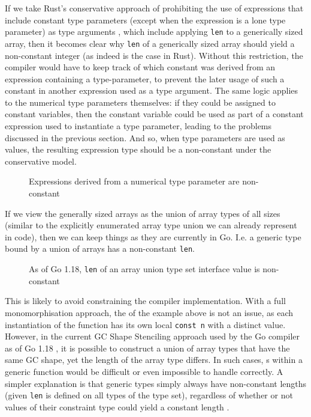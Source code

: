 If we take Rust's conservative approach of prohibiting the use of expressions
that include constant type parameters (except when the expression is a lone type
parameter) as type arguments \autocite{rustConstBlog}, which include applying
\texttt{len} to a generically sized array, then it becomes clear why
\texttt{len} of a generically sized array should yield a non-constant integer
(as indeed is the case in Rust). Without this restriction, the compiler would
have to keep track of which constant was derived from an expression containing a
type-parameter, to prevent the later usage of such a constant in another
 expression used as a type argument. The same logic applies to the
numerical type parameters themselves: if they could be assigned to constant
variables, then the constant variable could be used as part of a constant
expression used to instantiate a  type parameter, leading to the
problems discussed in the previous section. And so, when  type
parameters are used as values, the resulting expression type should be a
non-constant  under the conservative model.

\begin{figure}
    \caption{Expressions derived from a numerical type parameter are non-constant}
\end{figure}

If we view the generally sized arrays as the union of array types of all sizes
(similar to the explicitly enumerated array type union we can already represent
in code), then we can keep things as they are currently in Go. I.e. a generic
type bound by a union of arrays has a non-constant \texttt{len}.

\begin{figure}
    \caption{As of Go 1.18, \texttt{len} of an array union type set interface
        value is non-constant}
\end{figure}

This is likely to avoid constraining the compiler implementation. With a full
monomorphisation approach, the  of the example above is not an issue,
as each instantiation of the function has its own local \texttt{const n} with a
distinct value. However, in the current GC Shape Stenciling approach used by the
Go compiler as of Go 1.18 \autocite{generics1.18}, it is possible to construct a
union of array types that have the same GC shape, yet the length of the array
type differs. In such cases, s within a generic function would be
difficult or even impossible to handle correctly. A simpler explanation is that
generic types simply always have non-constant lengths (given \texttt{len} is
defined on all types of the type set), regardless of whether or not values of
their constraint type could yield a constant length \autocite{spec}.
